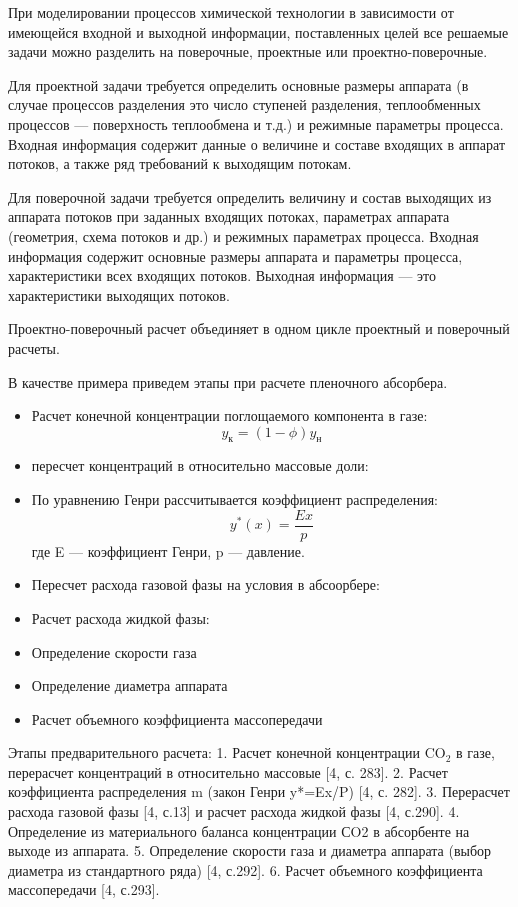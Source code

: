 При моделировании процессов химической технологии в зависимости от имеющейся входной и выходной информации, поставленных целей все решаемые задачи можно разделить на поверочные, проектные или проектно-поверочные.

Для проектной задачи требуется определить основные размеры аппарата (в случае процессов разделения это число ступеней разделения, теплообменных процессов --- поверхность теплообмена и т.д.) и режимные параметры процесса. Входная информация содержит данные о величине и составе входящих в аппарат потоков, а также ряд требований к выходящим потокам. 

Для поверочной задачи требуется определить величину и состав выходящих из аппарата потоков при заданных входящих потоках, параметрах аппарата (геометрия, схема потоков и др.) и режимных параметрах процесса. Входная информация содержит основные размеры аппарата и параметры процесса, характеристики всех входящих потоков. Выходная информация --- это характеристики выходящих потоков.

Проектно-поверочный расчет объединяет в одном цикле проектный и поверочный расчеты. 

В качестве примера приведем этапы при расчете пленочного абсорбера.
\begin{itemize}
\item Расчет конечной концентрации поглощаемого компонента в газе:
\begin{equation}
	y_к = (1-\phi) y_н
\end{equation}
\item пересчет концентраций в относительно массовые доли:

\item По уравнению Генри рассчитывается коэффициент распределения:
\begin{equation}
	y^*(x)=\dfrac{E x}{p}
\end{equation} 
где E --- коэффициент Генри, p --- давление.

\item Пересчет расхода газовой фазы на условия в абсоорбере:

\item Расчет расхода жидкой фазы:

\item Определение скорости газа
\item Определение диаметра аппарата

\item Расчет объемного коэффициента массопередачи

\end{itemize}
Этапы предварительного расчета:
1. Расчет конечной концентрации $\mathrm{CO_2}$ в газе, перерасчет концентраций в относительно массовые [4, с. 283].
2. Расчет коэффициента распределения m (закон Генри y*=Ex/P) [4, с. 282].
3. Перерасчет расхода газовой фазы [4, с.13] и расчет расхода жидкой фазы [4, с.290].
4. Определение из материального баланса концентрации СO2 в абсорбенте на выходе из аппарата.
5. Определение скорости газа и диаметра аппарата (выбор диаметра из стандартного ряда) [4, с.292].
6. Расчет объемного коэффициента массопередачи [4, с.293].


